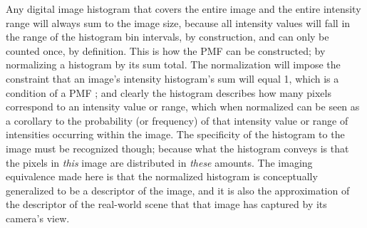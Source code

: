 Any digital image histogram that covers the entire image and the entire intensity range will always sum to the image size, because all intensity values will fall in the range of the histogram bin intervals, by construction, and can only be counted once, by definition. This is how the PMF can be constructed; by normalizing a histogram by its sum total. The normalization will impose the constraint that an image's intensity histogram's sum will equal 1, which is a condition of a PMF \cite{Papoulis2002}; and clearly the histogram describes how many pixels correspond to an intensity value or range, which when normalized can be seen as a corollary to the probability (or frequency) of that intensity value or range of intensities occurring within the image. The specificity of the histogram to the image must be recognized though; because what the histogram conveys is that the pixels in \textit{this} image are distributed in \textit{these} amounts. The imaging equivalence made here is that the normalized histogram is conceptually generalized to be a descriptor of the image, and it is also the approximation of the descriptor of the real-world scene that that image has captured by its camera's view.

\begin{figure}[h]
\centering
{}
\end{figure}

